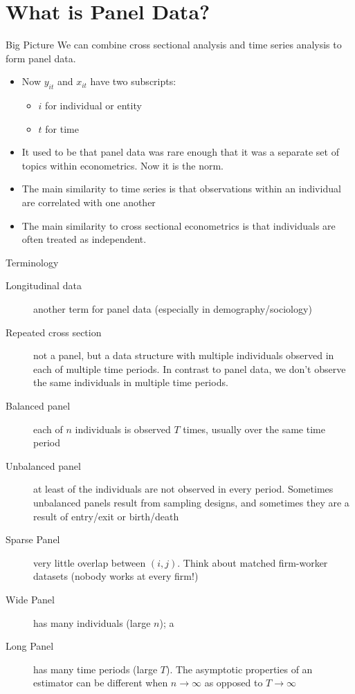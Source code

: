 

\section{What is Panel Data?}


\begin{frame}{Big Picture}
We can combine cross sectional analysis and time series analysis to form \alert{panel data}.
\begin{itemize}
\item Now $y_{it}$ and $x_{it}$ have two subscripts:
\begin{itemize}
\item $i$ for \alert{individual} or \alert{entity}
\item $t$ for \alert{time}
\end{itemize}
\item It used to be that panel data was rare enough that it was a separate set of topics within econometrics. Now it is the norm.
\item The main similarity to \alert{time series} is that observations within an individual are \alert{correlated} with one another
\item The main similarity to \alert{cross sectional} econometrics is that individuals are often treated as \alert{independent}.
\end{itemize}
\end{frame}

\begin{frame}{Terminology}
\begin{description}
\item[Longitudinal data] another term for panel data (especially in demography/sociology)
\item[Repeated cross section] not a panel, but a data structure with multiple
individuals observed in each of multiple time periods. In contrast to panel data,
we don't observe the same individuals in multiple time periods. 
\item[Balanced panel] each of $n$ individuals is observed $T$ times, usually
    over the same time period
\item[Unbalanced panel] at least of the individuals are not observed in every period.
    Sometimes unbalanced panels result from sampling designs, and sometimes they
    are a result of entry/exit or birth/death
\item[Sparse Panel] very little overlap between $(i,j)$. Think about matched firm-worker datasets (nobody works at every firm!)
\item[Wide Panel]has many individuals (large $n$); a
\item[Long Panel] has many time periods (large $T$). The asymptotic properties of an estimator can be different
 when $n \rightarrow \infty$ as opposed to $T \rightarrow \infty$
\end{description}
\end{frame}




